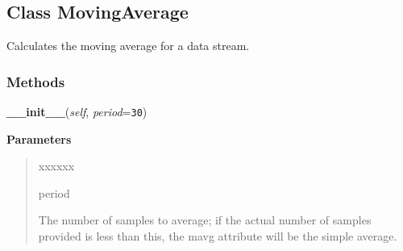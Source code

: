 \subsection{Class MovingAverage}

    \label{nukaquant:MovingAverage}
Calculates the moving average for a data stream.



  \subsubsection{Methods}

    \label{nukaquant:MovingAverage:__init__}

    \vspace{0.5ex}

\hspace{.8\funcindent}\begin{boxedminipage}{\funcwidth}

    \raggedright \textbf{\_\_init\_\_}(\textit{self}, \textit{period}={\tt 30})

\setlength{\parskip}{2ex}
\setlength{\parskip}{1ex}
      \textbf{Parameters}
      \vspace{-1ex}

      \begin{quote}
        \begin{Ventry}{xxxxxx}

          \item[period]

          The number of samples to average; if the actual number of samples
          provided is less than this, the mavg attribute will be the simple
          average.

        \end{Ventry}

      \end{quote}

    \end{boxedminipage}

    \label{nukaquant:MovingAverage:add_value}

